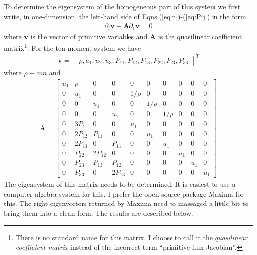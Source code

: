 \documentclass[11pt, reqno]{amsart}
\newcommand{\mvec}[1]{\mathbf{#1}}
\theoremstyle{definition}
\begin{document}
To determine the eigensystem of the homogeneous part of this system we
first write, in one-dimension, the left-hand side of
Eqns.\thinspace(\ref{eq:n})-(\ref{eq:Pij}) in the form
\begin{align}
  \partial_t{\mvec{v}} + \mvec{A}\partial_{1}{\mvec{v}} = 0 \label{eq:qlForm}
\end{align}
where $\mvec{v}$ is the vector of primitive variables and $\mvec{A}$
is the quasilinear coefficient matrix\footnote{There is no standard
  name for this matrix. I choose to call it the \emph{quasilinear
    coefficient matrix} instead of the incorrect term ``primitive flux
  Jacobian''.}. For the ten-moment system we have
\begin{align}
  \mvec{v} = 
    \left[
    \begin{matrix}
      \rho,
      u_1,
      u_2,
      u_3,
      P_{11},
      P_{12},
      P_{13},
      P_{22},
      P_{23},
      P_{33}
    \end{matrix}
  \right]^T
\end{align}
where $\rho \equiv mn$ and 
\begin{align}
  \mvec{A} = 
    \left[
    \begin{matrix}
      u_1  & \rho   & 0      & 0     & 0     & 0     & 0      & 0    & 0    & 0 \\
      0    & u_1    & 0      & 0     & 1/\rho & 0     & 0     & 0    & 0    & 0 \\
      0    & 0      & u_1    & 0     & 0     & 1/\rho & 0     & 0    & 0    & 0 \\
      0    & 0      & 0      & u_1   & 0     & 0     & 1/\rho & 0    & 0    & 0 \\
      0    & 3P_{11} & 0      & 0     & u_1   & 0     & 0      & 0    & 0    & 0 \\
      0    & 2P_{12} & P_{11} & 0     & 0    & u_1    & 0      & 0    & 0    & 0 \\
      0    & 2P_{13} & 0      & P_{11} & 0    & 0      & u_1    & 0    & 0    & 0 \\
      0    & P_{22}  & 2P_{12} & 0     & 0    & 0      & 0     & u_1   & 0    & 0 \\
      0    & P_{23}  & P_{13}  & P_{12} & 0    & 0      & 0     & 0     & u_1  & 0 \\
      0    & P_{33}  & 0      & 2P_{13} & 0   & 0      & 0     & 0     & 0    & u_1
    \end{matrix}
  \right]
\end{align}
The eigensystem of this matrix needs to be determined. It is easiest
to use a computer algebra system for this. I prefer the open source
package Maxima for this. The right-eigenvectors returned by Maxima
need to massaged a little bit to bring them into a clean form. The
results are described below.
\end{document}
